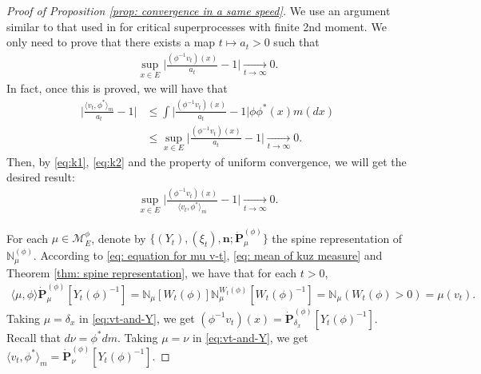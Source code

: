 \documentclass[12pt,a4paper]{amsart}
\theoremstyle{definition}
\numberwithin{equation}{section}
\begin{document}
\begin{proof}
  [Proof of Proposition \ref{prop: convergence in a same speed}]
	We use an argument similar to that used in \cite{RenSongSun2017Spine} for critical superprocesses with finite 2nd moment.
  We only need to prove that there exists a map $t\mapsto a_t > 0$ such that
  \begin{align}
    \label{eq:k1}
    \sup_{x\in E} \Big| \frac{ ( \phi^{-1} v_t )(x)}{ a_t} - 1 \Big|
    \xrightarrow[t\to \infty]{} 0.
  \end{align}
  In fact, once this is proved, we will have that
  \begin{align}
    \label{eq:k2}
    \Big |\frac {\langle v_t, \phi^*\rangle_m} {a_t } - 1 \Big |
    & \leq \int \Big | \frac{(\phi^{-1}v_t)(x)}{ a_t } - 1 \Big| \phi \phi^*(x) m(dx)\\
    & \leq \sup_{x\in E}\Big|\frac{(\phi^{-1}v_t)(x)}{ a_t }-1 \Big|
        \xrightarrow[t\to\infty]{} 0.
  \end{align}
  Then, by \eqref{eq:k1}, \eqref{eq:k2} and the property of uniform convergence, we will get the desired result:
  \begin{align}
    \sup_{x\in E}\Big|\frac{(\phi^{-1}v_t)(x)}{\langle v_{t},\phi^* \rangle_m}-1 \Big|
    \xrightarrow[t\to\infty]{} 0.
  \end{align}
	
  For each $\mu\in\mathcal M^\phi_E$, denote by $\{(Y_t), (\xi_t),\mathbf n; \dot {\mathbf P}^{(\phi)}_\mu\}$ the spine representation of $\mathbb N^{(\phi)}_\mu$.
	According to \eqref	{eq: equation for mu v-t}, \eqref{eq: mean of kuz measure} and Theorem \ref{thm: spine representation}, we have that for each $t>0$,
  \begin{align}
    \label{eq:vt-and-Y}
    \langle \mu,\phi \rangle \dot {\mathbf P}^{(\phi)}_\mu [Y_t(\phi)^{-1}]
    = \mathbb N_\mu[W_t(\phi)] \mathbb N^{W_t(\phi)}_\mu [W_t(\phi)^{-1}]
    = \mathbb N_\mu(W_t(\phi) > 0)
    = \mu(v_t).
  \end{align}
  Taking $\mu = \delta_x$ in \eqref{eq:vt-and-Y}, we get $(\phi^{-1}v_t)(x) =\dot{\mathbf P}_{\delta_x}^{(\phi)}[Y_t(\phi)^{-1}]$.
  Recall that $d\nu = \phi^* dm$.
  Taking $\mu = \nu$ in \eqref{eq:vt-and-Y}, we get $\langle v_t, \phi^*\rangle_m = \dot {\mathbf P}_{\nu}^{(\phi)} [Y_t(\phi)^{-1}]$.


\end{proof}
\end{document}
